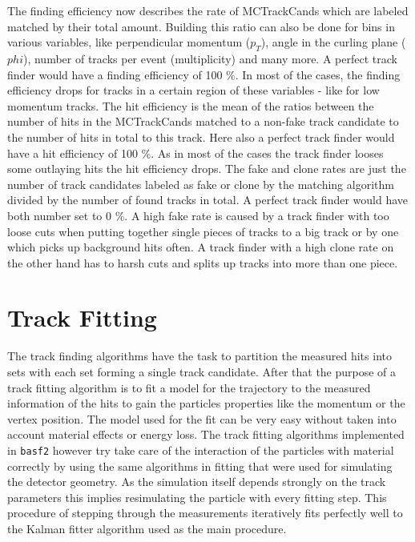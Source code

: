 The finding efficiency now describes the rate of MCTrackCands which are labeled matched by their total amount. Building this ratio can also be done for bins in various variables, like perpendicular momentum ($p_T$), angle in the curling plane ($phi$), number of tracks per event (multiplicity) and many more. A perfect track finder would have a finding efficiency of 100 \%. In most of the cases, the finding efficiency drops for tracks in a certain region of these variables - like for low momentum tracks.
The hit efficiency is the mean of the ratios between the number of hits in the MCTrackCands matched to a non-fake track candidate to the number of hits in total to this track. Here also a perfect track finder would have a hit efficiency of 100 \%. As in most of the cases the track finder looses some outlaying hits the hit efficiency drops.
The fake and clone rates are just the number of track candidates labeled as fake or clone by the matching algorithm divided by the number of found tracks in total. A perfect track finder would have both number set to 0 \%. A high fake rate is caused by a track finder with too loose cuts when putting together single pieces of tracks to a big track or by one which picks up background hits often. A track finder with a high clone rate on the other hand has to harsh cuts and splits up tracks into more than one piece.

\section{Track Fitting}

The track finding algorithms have the task to partition the measured hits into sets with each set forming a single track candidate. After that the purpose of a track fitting algorithm is to fit a model for the trajectory to the measured information of the hits to gain the particles properties like the momentum or the vertex position. The model used for the fit can be very easy without taken into account material effects or energy loss. The track fitting algorithms implemented in \texttt{basf2} however try take care of the interaction of the particles with material correctly by using the same algorithms in fitting that were used for simulating the detector geometry. As the simulation itself depends strongly on the track parameters this implies resimulating the particle with every fitting step. This procedure of stepping through the measurements iteratively fits perfectly well to the Kalman fitter algorithm used as the main procedure. 

